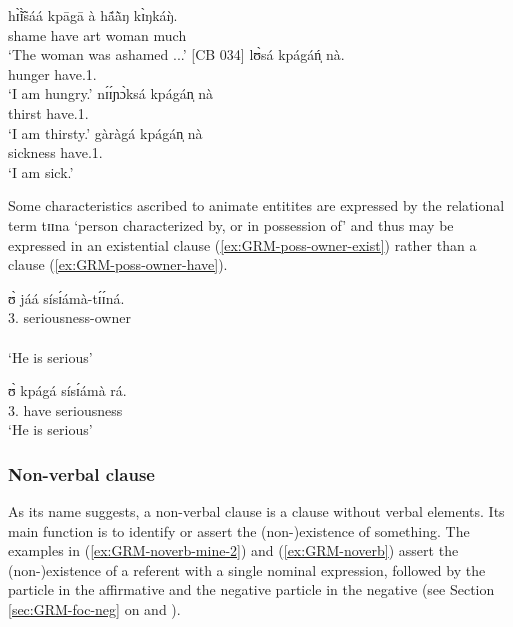 \ea\label{ex:GRM-poss-have-abst}

 \ea\label{ex:GRM-poss-have-abst-1}
\gll hɪ̃̀ɪ̃̀sáá kpāgā   à   hã́ã̀ŋ kɪ̀ŋkáŋ̀.\\
shame    have {\sc art}   woman much\\
\glt `The woman was ashamed ...' [CB 034]
\ex\label{ex:GRM-poss-have-abst-2}
\gll lʊ̀sá kpágáń̩ nà.\\
hunger have.{1.\sg} {\foc}\\
\glt `I am hungry.'
\ex\label{ex:GRM-poss-have-abst-3}
\gll  nɪ́ɪ́ɲɔ̀ksá kpágán̩ nà\\
thirst have.{1.\sg} {\foc}\\
\glt  `I am thirsty.'
\ex\label{ex:GRM-poss-have-abst-4}
\gll  gàràgá kpágán̩ nà\\
sickness have.{1.\sg} {\foc}\\
\glt  `I am sick.'

\z 
 \z

Some characteristics ascribed to animate entitites are expressed by the
relational term {\sls tɪɪna} `person characterized by, or in possession of' and thus may be expressed in an existential clause (\ref{ex:GRM-poss-owner-exist}) rather than a  clause (\ref{ex:GRM-poss-owner-have}). 



\ea\label{ex:GRM-poss-owner}

 \ea\label{ex:GRM-poss-owner-exist}
\glll ʊ̀ jáá sísɪ́ámà-tɪ́ɪ́ná.\\
{3.\sg} {\ident} seriousness-owner\\
  {\psor} {}   {\psed}\\
\glt `He is serious'

 \ex\label{ex:GRM-poss-owner-have}
\gll ʊ̀ kpágá sísɪ́ámà rá.\\
{3.\sg} have {seriousness} {\foc}\\
\glt `He is serious'

\z 
 \z

\subsubsection{Non-verbal clause}
\label{sec:GRM-noverb}

As its name suggests, a non-verbal clause is a clause without verbal elements. 
Its
main function is to identify or assert the (non-)existence of 
something.  The examples in (\ref{ex:GRM-noverb-mine-2}) and (\ref{ex:GRM-noverb}) assert 
the (non-)existence
of a
referent with a single nominal expression, followed by the  particle in
the affirmative and the negative particle in the negative (see Section
\ref{sec:GRM-foc-neg} on  and ). 


